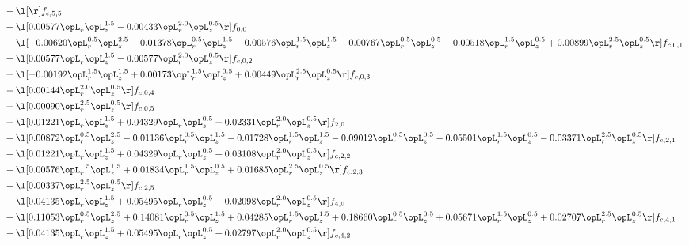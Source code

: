 \begin{alignat}{2}
& - \l[  \r] f_{c,5,5} \nonumber \\ 
& + \l[  0.00577 \opL_r \opL_z^{1.5}   -0.00433 \opL_r^{2.0} \opL_z^{0.5}  \r] f_{0,0} \nonumber \\ 
& + \l[  -0.00620 \opL_r^{0.5} \opL_z^{2.5}   -0.01378 \opL_r^{0.5} \opL_z^{1.5}   -0.00576 \opL_r^{1.5} \opL_z^{1.5}   -0.00767 \opL_r^{0.5} \opL_z^{0.5} +  0.00518 \opL_r^{1.5} \opL_z^{0.5} +  0.00899 \opL_r^{2.5} \opL_z^{0.5}  \r] f_{c,0,1} \nonumber \\ 
& + \l[  0.00577 \opL_r \opL_z^{1.5}   -0.00577 \opL_r^{2.0} \opL_z^{0.5}  \r] f_{c,0,2} \nonumber \\ 
& + \l[  -0.00192 \opL_r^{1.5} \opL_z^{1.5} +  0.00173 \opL_r^{1.5} \opL_z^{0.5} +  0.00449 \opL_r^{2.5} \opL_z^{0.5}  \r] f_{c,0,3} \nonumber \\ 
& - \l[  0.00144 \opL_r^{2.0} \opL_z^{0.5}  \r] f_{c,0,4} \nonumber \\ 
& + \l[  0.00090 \opL_r^{2.5} \opL_z^{0.5}  \r] f_{c,0,5} \nonumber \\ 
& + \l[  0.01221 \opL_r \opL_z^{1.5} +  0.04329 \opL_r \opL_z^{0.5} +  0.02331 \opL_r^{2.0} \opL_z^{0.5}  \r] f_{2,0} \nonumber \\ 
& + \l[  0.00872 \opL_r^{0.5} \opL_z^{2.5}   -0.01136 \opL_r^{0.5} \opL_z^{1.5}   -0.01728 \opL_r^{1.5} \opL_z^{1.5}   -0.09012 \opL_r^{0.5} \opL_z^{0.5}   -0.05501 \opL_r^{1.5} \opL_z^{0.5}   -0.03371 \opL_r^{2.5} \opL_z^{0.5}  \r] f_{c,2,1} \nonumber \\ 
& + \l[  0.01221 \opL_r \opL_z^{1.5} +  0.04329 \opL_r \opL_z^{0.5} +  0.03108 \opL_r^{2.0} \opL_z^{0.5}  \r] f_{c,2,2} \nonumber \\ 
& - \l[  0.00576 \opL_r^{1.5} \opL_z^{1.5} +  0.01834 \opL_r^{1.5} \opL_z^{0.5} +  0.01685 \opL_r^{2.5} \opL_z^{0.5}  \r] f_{c,2,3} \nonumber \\ 
& - \l[  0.00337 \opL_r^{2.5} \opL_z^{0.5}  \r] f_{c,2,5} \nonumber \\ 
& - \l[  0.04135 \opL_r \opL_z^{1.5} +  0.05495 \opL_r \opL_z^{0.5} +  0.02098 \opL_r^{2.0} \opL_z^{0.5}  \r] f_{4,0} \nonumber \\ 
& + \l[  0.11053 \opL_r^{0.5} \opL_z^{2.5} +  0.14081 \opL_r^{0.5} \opL_z^{1.5} +  0.04285 \opL_r^{1.5} \opL_z^{1.5} +  0.18660 \opL_r^{0.5} \opL_z^{0.5} +  0.05671 \opL_r^{1.5} \opL_z^{0.5} +  0.02707 \opL_r^{2.5} \opL_z^{0.5}  \r] f_{c,4,1} \nonumber \\ 
& - \l[  0.04135 \opL_r \opL_z^{1.5} +  0.05495 \opL_r \opL_z^{0.5} +  0.02797 \opL_r^{2.0} \opL_z^{0.5}  \r] f_{c,4,2} \nonumber \\ 

\end{alignat}
